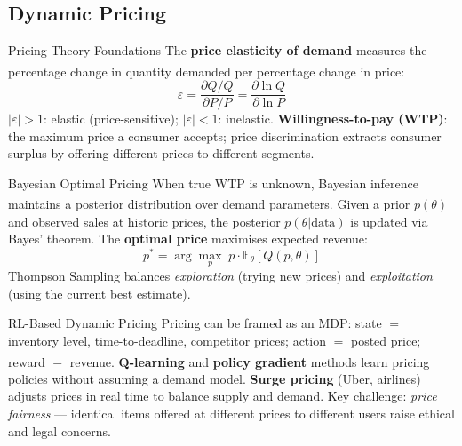 \subsection{Dynamic Pricing}


\begin{v3topic}{Pricing Theory Foundations}
    The \textbf{price elasticity of demand} measures the percentage change in quantity demanded per percentage change in price\textsuperscript{\cite[][pp.~39--42]{laudonECommerce2020}}:
    \begin{equation}
        \varepsilon = \frac{\partial Q / Q}{\partial P / P} = \frac{\partial \ln Q}{\partial \ln P}
    \end{equation}
    $|\varepsilon| > 1$: elastic (price-sensitive); $|\varepsilon| < 1$: inelastic.
    \textbf{Willingness-to-pay (WTP)}: the maximum price a consumer accepts; price discrimination extracts consumer surplus by offering different prices to different segments.

\end{v3topic}
\begin{v3topic}{Bayesian Optimal Pricing}
    When true WTP is unknown, Bayesian inference maintains a posterior distribution over demand parameters\textsuperscript{\cite[][pp.~45--48]{laudonECommerce2020}}.
    Given a prior $p(\theta)$ and observed sales at historic prices, the posterior $p(\theta | \text{data})$ is updated via Bayes' theorem.
    The \textbf{optimal price} maximises expected revenue:
    \begin{equation}
        p^* = \arg\max_p \; p \cdot \mathbb{E}_\theta[Q(p, \theta)]
    \end{equation}
    Thompson Sampling balances \emph{exploration} (trying new prices) and \emph{exploitation} (using the current best estimate).

\end{v3topic}
\begin{v3topic}{RL-Based Dynamic Pricing}
    Pricing can be framed as an MDP: state $= $ inventory level, time-to-deadline, competitor prices; action $= $ posted price; reward $= $ revenue\textsuperscript{\cite[][pp.~55--60]{laudonECommerce2020}}.
    \textbf{Q-learning} and \textbf{policy gradient} methods learn pricing policies without assuming a demand model.
    \textbf{Surge pricing} (Uber, airlines) adjusts prices in real time to balance supply and demand.
    Key challenge: \emph{price fairness} --- identical items offered at different prices to different users raise ethical and legal concerns.

\end{v3topic}
